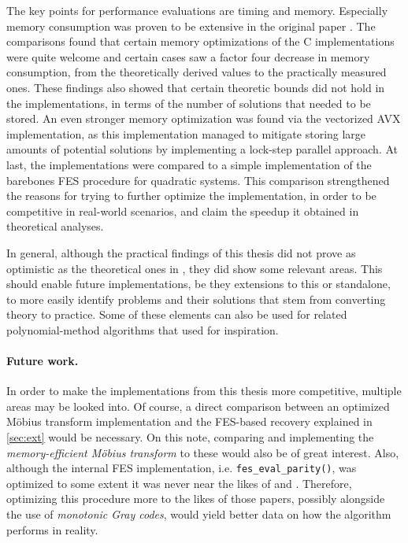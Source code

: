 The key points for performance evaluations are timing and memory. Especially memory consumption was proven to be extensive in the original paper \cite{eurocrypt-2021-30841}. The comparisons found that certain memory optimizations of the C implementations were quite welcome and certain cases saw a factor four decrease in memory consumption, from the theoretically derived values to the practically measured ones. These findings also showed that certain theoretic bounds did not hold in the implementations, in terms of the number of solutions that needed to be stored. An even stronger memory optimization was found via the vectorized AVX implementation, as this implementation managed to mitigate storing large amounts of potential solutions by implementing a lock-step parallel approach. At last, the implementations were compared to a simple implementation of the barebones FES procedure for quadratic systems. This comparison strengthened the reasons for trying to further optimize the implementation, in order to be competitive in real-world scenarios, and claim the speedup it obtained in theoretical analyses. 

In general, although the practical findings of this thesis did not prove as optimistic as the theoretical ones in \cite{eurocrypt-2021-30841}, they did show some relevant areas. This should enable future implementations, be they extensions to this or standalone, to more easily identify problems and their solutions that stem from converting theory to practice. Some of these elements can also be used for related polynomial-method algorithms that \cite{eurocrypt-2021-30841} used for inspiration.

\paragraph{Future work.} In order to make the implementations from this thesis more competitive, multiple areas may be looked into. Of course, a direct comparison between an optimized Möbius transform implementation and the FES-based recovery explained in \cref{sec:ext} would be necessary. On this note, comparing and implementing the \textit{memory-efficient Möbius transform} to these would also be of great interest. Also, although the internal FES implementation, i.e. \texttt{fes\_eval\_parity()}, was optimized to some extent it was never near the likes of \cite{ches-2010-23990} and \cite{cryptoeprint:2013/436}. Therefore, optimizing this procedure more to the likes of those papers, possibly alongside the use of \textit{monotonic Gray codes}, would yield better data on how the algorithm performs in reality.

